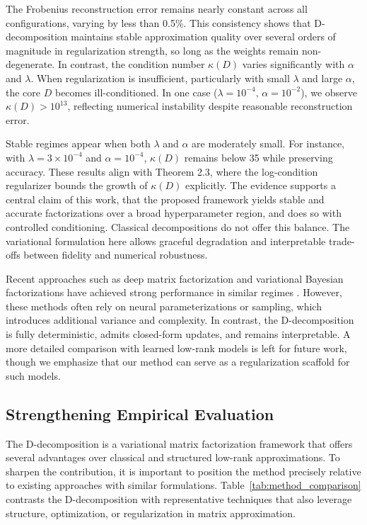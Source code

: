 \documentclass[10pt,a4paper]{article}
\begin{document}
The Frobenius reconstruction error remains nearly constant across all configurations, varying by less than 0.5\%. This consistency shows that D-decomposition maintains stable approximation quality over several orders of magnitude in regularization strength, so long as the weights remain non-degenerate. In contrast, the condition number $\kappa(D)$ varies significantly with $\alpha$ and $\lambda$. When regularization is insufficient, particularly with small $\lambda$ and large $\alpha$, the core $D$ becomes ill-conditioned. In one case ($\lambda = 10^{-4}$, $\alpha = 10^{-2}$), we observe $\kappa(D) > 10^{13}$, reflecting numerical instability despite reasonable reconstruction error.

Stable regimes appear when both $\lambda$ and $\alpha$ are moderately small. For instance, with $\lambda = 3 \times 10^{-4}$ and $\alpha = 10^{-4}$, $\kappa(D)$ remains below 35 while preserving accuracy. These results align with Theorem 2.3, where the log-condition regularizer bounds the growth of $\kappa(D)$ explicitly. The evidence supports a central claim of this work, that the proposed framework yields stable and accurate factorizations over a broad hyperparameter region, and does so with controlled conditioning. Classical decompositions do not offer this balance. The variational formulation here allows graceful degradation and interpretable trade-offs between fidelity and numerical robustness.

Recent approaches such as deep matrix factorization and variational Bayesian factorizations have achieved strong performance in similar regimes \cite{zhang2023deep, chen2024variational, lee2022neural, wang2023bayesian}. However, these methods often rely on neural parameterizations or sampling, which introduces additional variance and complexity. In contrast, the D-decomposition is fully deterministic, admits closed-form updates, and remains interpretable. A more detailed comparison with learned low-rank models is left for future work, though we emphasize that our method can serve as a regularization scaffold for such models.


\subsection{Strengthening Empirical Evaluation}

The D-decomposition is a variational matrix factorization framework that offers several advantages over classical and structured low-rank approximations. To sharpen the contribution, it is important to position the method precisely relative to existing approaches with similar formulations. Table~\ref{tab:method_comparison} contrasts the D-decomposition with representative techniques that also leverage structure, optimization, or regularization in matrix approximation.
\end{document}
